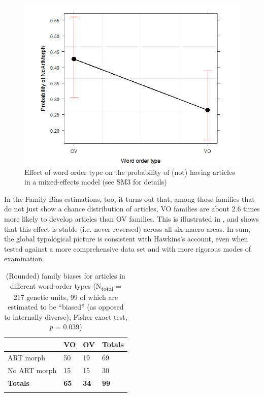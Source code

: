 \documentclass[output=paper]{langsci/langscibook}
\begin{document}
  

\begin{figure}
\includegraphics[height=.3\textheight]{figures/schmidtkebode-img2.png}
\caption{Effect of word order type on the probability of (not) having articles in a mixed-effects model (see SM3 for details)}
\label{fig:ksb:2}
\end{figure}

In the Family Bias estimations, too, it turns out that, among those families that do not just show a chance distribution of articles, VO families are about 2.6 times more likely to develop articles than OV families. This is illustrated in , and  shows that this effect is stable (i.e. never reversed) across all six macro areas. In sum, the global typological picture is consistent with Hawkins’s  account, even when tested against a more comprehensive data set and with more rigorous modes of examination.
 

\begin{table}
\begin{tabularx}{.8\textwidth}{lYYY}
\lsptoprule
& VO &   OV &   Totals\\
\midrule 
ART morph & 50 & 19 & 69\\
No ART morph & 15 & 15 & 30\\
\midrule
\textbf{Totals} & \textbf{65} & \textbf{34} & \textbf{99}\\
\lspbottomrule
\end{tabularx} 
\caption{(Rounded) family biases for articles in different word-order types (N\textsubscript{total} = 217 genetic units, 99 of which are estimated to be “biased” (as opposed to internally diverse); Fisher exact test, \textit{p} = 0.039)}
\label{tab:ksb:3}
\end{table}
   
\end{document}
